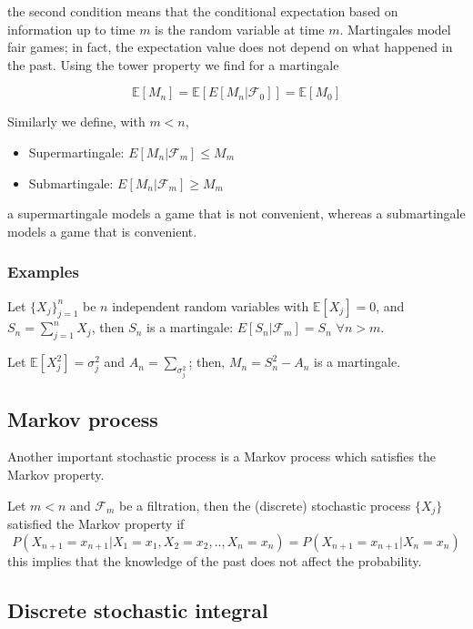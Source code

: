 \documentclass[11pt,a4paper]{article}
\begin{document}
the second condition means that the conditional expectation based on information up to time $m$ is the random variable at time $m$. Martingales model fair games; in fact, the expectation value does not depend on what happened in the past. Using the tower property we find for a martingale 

\begin{equation}
    \mathbb{E}[M_{n}] = \mathbb{E}[E[M_{n}|\mathcal{F}_0]] =  \mathbb{E}[M_{0}]
\end{equation}


Similarly we define, with $m<n$,

\begin{itemize}
    \item Supermartingale:  $E[M_n|\mathcal{F}_m] \leq M_m$
    \item Submartingale:  $E[M_n|\mathcal{F}_m] \geq M_m$
\end{itemize}

a supermartingale models a game that is not convenient, whereas a submartingale models a game that is convenient.

\subsubsection{Examples}

Let $\{X_j\}_{j=1}^n$ be $n$ independent random variables with $\mathbb{E}[X_j]=0$, and $S_n = \sum_{j=1}^n X_j$, then $S_n$ is a martingale: $E[S_n|\mathcal{F}_m] = S_n$ $\forall n >m$. 

Let $\mathbb{E}[X^2_j] = \sigma_j^2$ and $A_n = \sum_{\sigma^2_j}$; then, $M_n = S^2_n-A_n$ is a martingale.

\subsection{Markov process}
 
Another important stochastic process is a Markov process which satisfies the Markov property.

Let $m<n$ and $\mathcal{F}_m$ be a filtration, then the (discrete) stochastic process $\{X_j\}$ satisfied the Markov property if
\begin{equation}
    P(X_{n+1} = x_{n+1}|X_1 = x_1,X_2=x_2,..,X_{n}=x_n) = P(X_{n+1} = x_{n+1}|X_n=x_n)
\end{equation}
this implies that the knowledge of the past does not affect the probability.
\subsection{Discrete stochastic integral}
\end{document}
